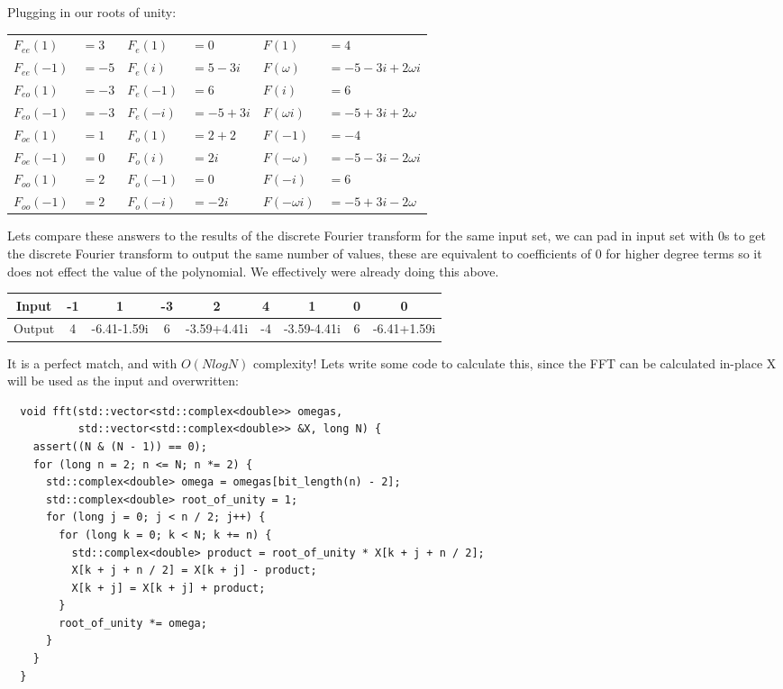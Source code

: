 \documentclass[12pt]{article}
\begin{document}
Plugging in our roots of unity:
\begin{center}
  \begin{tabular}{ll | ll | ll}
    $F_{ee}(1)$  & $= 3$  & $F_e(1)$  & $= 0$       & $F(1)$         & $= 4$                    \\
    $F_{ee}(-1)$ & $= -5$ & $F_e(i)$  & $= 5 - 3i$  & $F(\omega)$    & $= - 5 - 3i + 2\omega i$ \\
    $F_{eo}(1)$  & $= -3$ & $F_e(-1)$ & $= 6$       & $F(i)$         & $= 6$                    \\
    $F_{eo}(-1)$ & $= -3$ & $F_e(-i)$ & $= -5 + 3i$ & $F(\omega i)$  & $= - 5 + 3i + 2\omega$   \\
    $F_{oe}(1)$  & $= 1$  & $F_o(1)$  & $= 2 + 2$   & $F(-1)$        & $= -4$                   \\
    $F_{oe}(-1)$ & $= 0$  & $F_o(i)$  & $= 2i$      & $F(-\omega)$   & $= - 5 - 3i - 2\omega i$ \\
    $F_{oo}(1)$  & $= 2$  & $F_o(-1)$ & $= 0$       & $F(-i)$        & $= 6$                    \\
    $F_{oo}(-1)$ & $= 2$  & $F_o(-i)$ & $= -2i$     & $F(-\omega i)$ & $= - 5 + 3i - 2\omega$   \\
  \end{tabular}
\end{center}

Lets compare these answers to the results of the discrete Fourier transform for the same input set, we can pad in input set with 0s to get the discrete Fourier transform to output the same number of values, these are equivalent to coefficients of 0 for higher degree terms so it does not effect the value of the polynomial. We effectively were already doing this above.
\begin{center}
  \begin{tabular}{ |c|c|c|c|c|c|c|c|c| }
    \hline
    Input  & -1 & 1           & -3 & 2           & 4  & 1           & 0 & 0           \\
    \hline
    Output & 4  & -6.41-1.59i & 6  & -3.59+4.41i & -4 & -3.59-4.41i & 6 & -6.41+1.59i \\
    \hline
  \end{tabular}
\end{center}

It is a perfect match, and with $O(NlogN)$ complexity! Lets write some code to calculate this, since the FFT can be calculated in-place X will be used as the input and overwritten:
\begin{lstlisting}
  void fft(std::vector<std::complex<double>> omegas, 
           std::vector<std::complex<double>> &X, long N) {
    assert((N & (N - 1)) == 0);
    for (long n = 2; n <= N; n *= 2) {
      std::complex<double> omega = omegas[bit_length(n) - 2];
      std::complex<double> root_of_unity = 1;
      for (long j = 0; j < n / 2; j++) {
        for (long k = 0; k < N; k += n) {
          std::complex<double> product = root_of_unity * X[k + j + n / 2];
          X[k + j + n / 2] = X[k + j] - product;
          X[k + j] = X[k + j] + product;
        }
        root_of_unity *= omega;
      }
    }
  }
\end{lstlisting}
\end{document}
